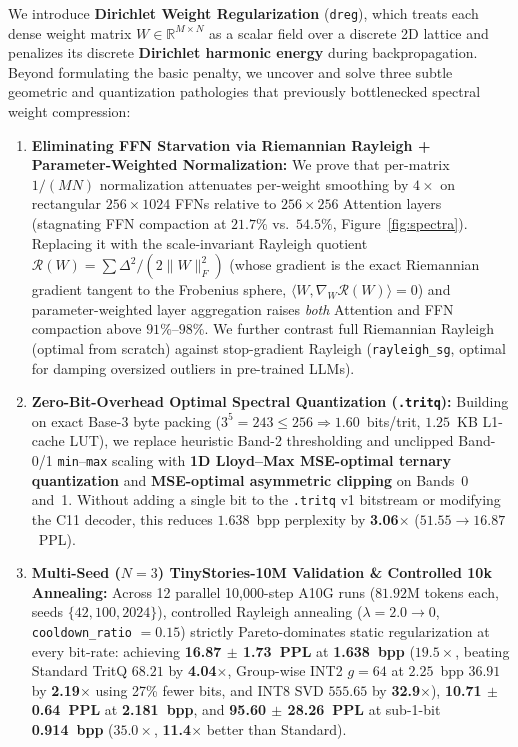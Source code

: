 \documentclass[11pt,a4paper]{article}
\begin{document}
We introduce \textbf{Dirichlet Weight Regularization} (\texttt{dreg}), which treats each dense weight matrix $W \in \mathbb{R}^{M \times N}$ as a scalar field over a discrete 2D lattice and penalizes its discrete \textbf{Dirichlet harmonic energy} during backpropagation. Beyond formulating the basic penalty, we uncover and solve three subtle geometric and quantization pathologies that previously bottlenecked spectral weight compression:
\begin{enumerate}
    \item \textbf{Eliminating FFN Starvation via Riemannian Rayleigh + Parameter-Weighted Normalization:} We prove that per-matrix $1/(MN)$ normalization attenuates per-weight smoothing by $4\times$ on rectangular $256\times1024$ FFNs relative to $256\times256$ Attention layers (stagnating FFN compaction at $21.7\%$ vs.\ $54.5\%$, Figure~\ref{fig:spectra}). Replacing it with the scale-invariant Rayleigh quotient $\mathcal{R}(W) = \sum \Delta^2 / (2\|W\|_F^2)$ (whose gradient is the exact Riemannian gradient tangent to the Frobenius sphere, $\langle W, \nabla_W \mathcal{R}(W)\rangle = 0$) and parameter-weighted layer aggregation raises \emph{both} Attention and FFN compaction above $91\%$--$98\%$. We further contrast full Riemannian Rayleigh (optimal from scratch) against stop-gradient Rayleigh (\texttt{rayleigh\_sg}, optimal for damping oversized outliers in pre-trained LLMs).
    \item \textbf{Zero-Bit-Overhead Optimal Spectral Quantization (\texttt{.tritq}):} Building on exact Base-3 byte packing ($3^5 = 243 \le 256 \Rightarrow 1.60$~bits/trit, $1.25$~KB L1-cache LUT), we replace heuristic Band-2 thresholding and unclipped Band-0/1 \texttt{min}--\texttt{max} scaling with \textbf{1D Lloyd--Max MSE-optimal ternary quantization} and \textbf{MSE-optimal asymmetric clipping} on Bands~0 and~1. Without adding a single bit to the \texttt{.tritq} v1 bitstream or modifying the C11 decoder, this reduces $1.638$~bpp perplexity by \textbf{3.06$\times$} ($51.55 \to 16.87$~PPL).
    \item \textbf{Multi-Seed ($N=3$) TinyStories-10M Validation \& Controlled 10k Annealing:} Across 12 parallel 10,000-step A10G runs ($81.92$M tokens each, seeds $\{42, 100, 2024\}$), controlled Rayleigh annealing ($\lambda = 2.0 \to 0$, \texttt{cooldown\_ratio} $= 0.15$) strictly Pareto-dominates static regularization at every bit-rate: achieving \textbf{16.87 $\pm$ 1.73~PPL} at \textbf{1.638~bpp} ($19.5\times$, beating Standard TritQ $68.21$ by \textbf{4.04$\times$}, Group-wise INT2 $g=64$ at $2.25$~bpp $36.91$ by \textbf{2.19$\times$} using 27\% fewer bits, and INT8 SVD $555.65$ by \textbf{32.9$\times$}), \textbf{10.71 $\pm$ 0.64~PPL} at \textbf{2.181~bpp}, and \textbf{95.60 $\pm$ 28.26~PPL} at sub-1-bit \textbf{0.914~bpp} ($35.0\times$, \textbf{11.4$\times$} better than Standard).

\end{enumerate}
\end{document}
